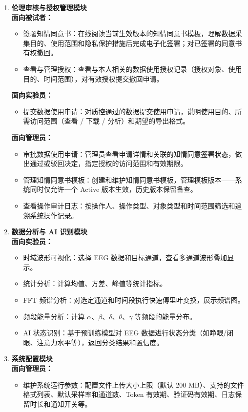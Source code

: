 \begin{enumerate}[(1)]
  \item \textbf{伦理审核与授权管理模块}\\
    \textbf{面向被试者：}
    \begin{itemize}
      \item 签署知情同意书：在线阅读当前生效版本的知情同意书模板，理解数据采集目的、使用范围和隐私保护措施后完成电子化签署；对已签署的同意书有权撤回。
      \item 查看与管理授权：查看与本人相关的数据使用授权记录（授权对象、使用目的、时间范围），对有效授权提交撤回申请。
    \end{itemize}
    \textbf{面向实验员：}
    \begin{itemize}
      \item 提交数据使用申请：对质控通过的数据提交使用申请，说明使用目的、所需访问范围（查看 / 下载 / 分析）和期望的导出格式。
    \end{itemize}
    \textbf{面向管理员：}
    \begin{itemize}
      \item 审批数据使用申请：管理员查看申请详情和关联的知情同意签署状态，做出通过或驳回决定，指定授权的访问范围和有效期限。
      \item 管理知情同意书模板：创建和维护知情同意书模板，管理模板版本——系统同时仅允许一个 Active 版本生效，历史版本保留备查。
      \item 查看操作审计日志：按操作人、操作类型、对象类型和时间范围筛选和追溯系统操作记录。
    \end{itemize}

  \item \textbf{数据分析与 AI 识别模块}\\
    \textbf{面向实验员：}
    \begin{itemize}
      \item 时域波形可视化：选择 EEG 数据和目标通道，查看多通道波形叠加显示。
      \item 统计分析：计算均值、方差、峰值等统计指标。
      \item FFT 频谱分析：对选定通道和时间段执行快速傅里叶变换，展示频谱图。
      \item 频段能量分析：计算 $\alpha$、$\beta$、$\delta$、$\theta$、$\gamma$ 等频段的能量分布。
      \item AI 状态识别：基于预训练模型对 EEG 数据进行状态分类（如睁眼/闭眼、注意力水平等），返回分类结果和置信度。
    \end{itemize}

  \item \textbf{系统配置模块}\\
    \textbf{面向管理员：}
    \begin{itemize}
      \item 维护系统运行参数：配置文件上传大小上限（默认 200 MB）、支持的文件格式列表、默认采样率和通道数、Token 有效期、验证码有效期、日志保留时长和通知开关等。
    \end{itemize}
\end{enumerate}

